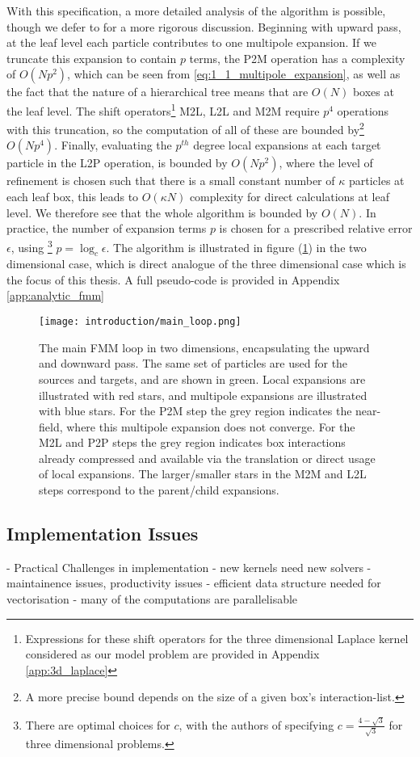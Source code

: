 With this specification, a more detailed analysis of the algorithm is possible,
though we defer to \cite{Greengard:1987:Yale} for a more rigorous discussion.
Beginning with upward pass, at the leaf level each particle contributes to one
multipole expansion. If we truncate this expansion to contain $p$ terms, the
\gls{P2M} operation has a complexity of $O(Np^2)$, which can be seen from
\ref{eq:1_1_multipole_expansion}, as well as the fact that the nature of a
hierarchical tree means that are $O(N)$ boxes at the leaf level. The shift operators\footnote{
    Expressions for these shift operators for the three dimensional Laplace kernel
    considered as our model problem are provided in Appendix \ref{app:3d_laplace}
} \gls{M2L}, \gls{L2L} and \gls{M2M} require $p^4$ operations with this truncation,
so the computation of all of these are bounded by\footnote{A more precise
bound depends on the size of a given box's \gls{interaction-list}.} $O(Np^4)$. Finally,
evaluating the $p^{th}$ degree local expansions at each target particle in the
\gls{L2P} operation, is bounded by $O(Np^2)$, where the level of refinement is
chosen such that there is a small constant number of $\kappa$ particles at each
leaf box, this leads to $O(\kappa N)$ complexity for direct calculations at leaf level. We therefore
see that the whole algorithm is bounded by $O(N)$. In practice, the number of
expansion terms $p$ is chosen for a prescribed relative error $\epsilon$, using
\footnote{There are optimal choices for $c$, with the authors of \cite{Ying:2004:JCP}
specifying $c=\frac{4-\sqrt{3}}{\sqrt{3}}$ for three dimensional problems.}
$p=\log_c \epsilon$. The algorithm is illustrated in figure (\ref{fig:1_1_main_loop})
in the two dimensional case, which is direct analogue of the three dimensional case
which is the focus of this thesis. A full pseudo-code is provided in Appendix
\ref{app:analytic_fmm}

\begin{figure}[!h]
    \centering
    {\texttt{[image: introduction/main\_loop.png]}}
  \caption{
      The main FMM loop in two dimensions, encapsulating the upward and downward
      pass. The same set of particles are used for the sources and targets, and
      are shown in green. Local expansions are illustrated with red stars, and
      multipole expansions are illustrated with blue stars. For the P2M step the
      grey region indicates the \gls{near-field}, where this multipole expansion
      does not converge. For the M2L and P2P steps the grey region indicates
      box interactions already compressed and available via the translation or
      direct usage of local expansions. The larger/smaller stars in the M2M and
      L2L steps correspond to the parent/child expansions.
  }
  \label{fig:1_1_main_loop}
\end{figure}

\subsection{Implementation Issues}

- Practical Challenges in implementation
- new kernels need new solvers
    - maintainence issues, productivity issues
- efficient data structure needed for vectorisation
- many of the computations are parallelisable

\hspace{10pt}
